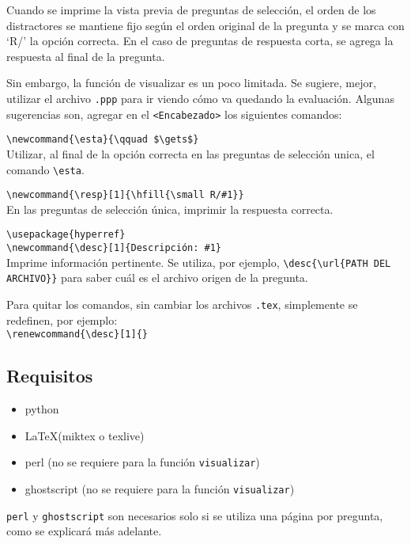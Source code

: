 \documentclass[12pt]{article}
\theoremstyle{definition}
\begin{document}
\begin{itemize}
    Cuando se imprime la vista previa de preguntas de selección, el orden de los distractores se mantiene fijo según el orden original de la pregunta y se marca con `R/' la opción correcta. En el caso de preguntas de respuesta corta, se agrega la respuesta al final de la pregunta.
    \bigskip

    Sin embargo, la funci\'on de visualizar es un poco limitada. Se sugiere, mejor, utilizar el archivo \verb|.ppp| para ir viendo c\'omo va quedando la evaluaci\'on. Algunas sugerencias son, agregar en el \verb|<Encabezado>| los siguientes comandos:

    \noindent \verb|\newcommand{\esta}{\qquad $\gets$}| \\
    Utilizar, al final de la opci\'on correcta en las preguntas de selecci\'on unica, el comando \verb|\esta|.
    \medskip

    \noindent \verb|\newcommand{\resp}[1]{\hfill{\small R/#1}}| \\
    En las preguntas de selecci\'on \'unica, imprimir la respuesta correcta.
    \medskip

    \noindent \verb|\usepackage{hyperref}| \\
    \noindent \verb|\newcommand{\desc}[1]{Descripción: #1}| \\
    Imprime información pertinente. Se utiliza, por ejemplo, \verb|\desc{\url{PATH DEL ARCHIVO}}| para saber cu\'al es el archivo origen de la pregunta.
    \medskip

    Para quitar los comandos, sin cambiar los archivos \verb|.tex|, simplemente se redefinen, por ejemplo: \\
    \noindent \verb|\renewcommand{\desc}[1]{}|
\end{itemize}

\subsection{Requisitos}
\begin{itemize}
  \item python
  \item \LaTeX (miktex o texlive)
  \item perl (no se requiere para la función \verb|visualizar|)
  \item ghostscript (no se requiere para la función \verb|visualizar|)
\end{itemize}
\verb|perl| y \verb|ghostscript| son necesarios solo si se utiliza una p\'agina por pregunta, como se explicar\'a m\'as adelante.
\end{document}

